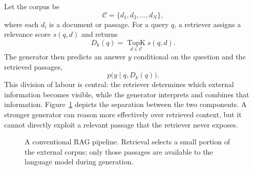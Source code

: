 Let the corpus be
\begin{equation}
  \mathcal{C}=\{d_1,d_2,\ldots,d_N\},
  \label{eq:corpus}
\end{equation}
where each \(d_i\) is a document or passage. For a query \(q\), a retriever
assigns a relevance score \(s(q,d)\) and returns
\begin{equation}
  D_k(q)=\operatorname*{TopK}_{d\in\mathcal{C}} s(q,d).
  \label{eq:top-k}
\end{equation}
The generator then predicts an answer \(y\) conditional on the question and the
retrieved passages,
\begin{equation}
  p\bigl(y\mid q,D_k(q)\bigr).
  \label{eq:rag-generation}
\end{equation}
This division of labour is central: the retriever determines which external
information becomes visible, while the generator interprets and combines that
information. Figure~\ref{fig:rag-pipeline} depicts the separation between the
two components. A stronger generator can reason more effectively over retrieved
context, but it cannot directly exploit a relevant passage that the retriever
never exposes.

\begin{figure}[htbp]
  \centering
  \caption[Separation of retrieval and generation in RAG]{A conventional RAG
    pipeline. Retrieval selects a small portion of the external corpus; only
    those passages are available to the language model during generation.}
  \label{fig:rag-pipeline}
\end{figure}

